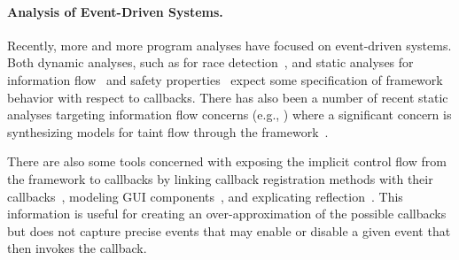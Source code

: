 \documentclass[10pt,reprint,nocopyrightspace,numbers]{sigplanconf}
\begin{document}
\paragraph{Analysis of Event-Driven Systems.}


Recently, more and more program analyses have focused on event-driven systems. Both dynamic analyses, such as for race detection~\cite{droidracer, cafa}, and static analyses for information flow~\cite{DBLP:conf/pldi/ArztRFBBKTOM14} and safety properties~\cite{DBLP:conf/oopsla/BlackshearCS15} expect some specification of framework behavior with respect to callbacks.
%
There has also been a number of recent static analyses targeting information flow concerns (e.g., 
\cite{DBLP:conf/ndss/GordonKPGNR,DBLP:conf/sigsoft/FengADA14,DBLP:conf/ccs/WeiROR14}) where a significant concern is synthesizing models for taint flow through the framework~\cite{DBLP:conf/popl/BastaniAA15}.



There are also some tools concerned with exposing the implicit control flow from the framework to callbacks by linking
callback registration methods with their callbacks~\cite{DBLP:conf/ndss/CaoFBEKVC15,node-js-cg},
modeling GUI components~\cite{DBLP:conf/icse/YangYWWR15}, and explicating reflection~\cite{DBLP:conf/pldi/BlackshearGC15}.
This information is useful for creating an over-approximation of the possible callbacks but does not capture precise events that may enable or disable a given event that then invokes the callback.
\end{document}
